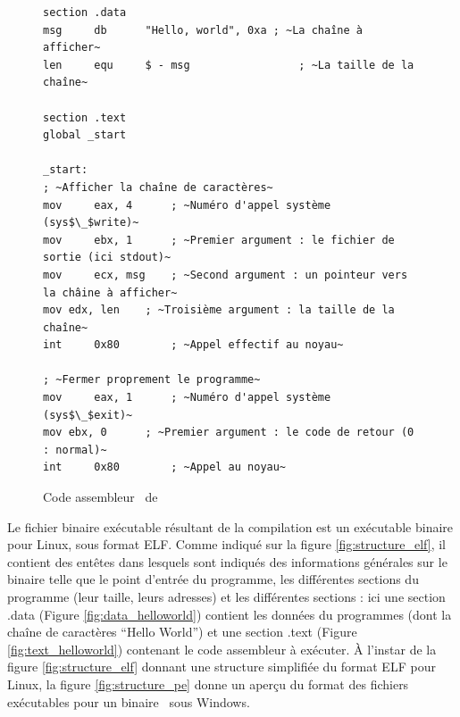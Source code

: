 \begin{figure}
\begin{lstlisting}[language={[x86masm]Assembler}, escapechar=~]
section .data
msg     db      "Hello, world", 0xa	; ~La chaîne à afficher~
len     equ     $ - msg                 ; ~La taille de la chaîne~

section .text
global _start

_start:
; ~Afficher la chaîne de caractères~
mov     eax, 4      ; ~Numéro d'appel système (sys$\_$write)~
mov     ebx, 1      ; ~Premier argument : le fichier de sortie (ici stdout)~
mov     ecx, msg    ; ~Second argument : un pointeur vers la châine à afficher~
mov	edx, len    ; ~Troisième argument : la taille de la chaîne~
int     0x80        ; ~Appel effectif au noyau~

; ~Fermer proprement le programme~
mov     eax, 1      ; ~Numéro d'appel système (sys$\_$exit)~
mov	ebx, 0	    ; ~Premier argument : le code de retour (0 : normal)~
int     0x80	    ; ~Appel au noyau~
\end{lstlisting}
\caption{Code assembleur \xq\ de \helloworld}
\label{fig:helloword_asm}
\end{figure}

Le fichier binaire exécutable résultant de la compilation est un exécutable binaire pour Linux, sous format ELF.
Comme indiqué sur la figure \ref{fig:structure_elf}, il contient des entêtes dans lesquels sont indiqués des informations générales sur le binaire telle que le point d'entrée du programme, les différentes sections du programme (leur taille, leurs adresses) et les différentes sections : ici une section .data (Figure \ref{fig:data_helloworld}) contient les données du programmes (dont la chaîne de caractères ``Hello World'') et une section .text (Figure \ref{fig:text_helloworld}) contenant le code assembleur à exécuter.
À l'instar de la figure \ref{fig:structure_elf} donnant une structure simplifiée du format ELF pour Linux, la figure \ref{fig:structure_pe} donne un aperçu du format des fichiers exécutables pour un binaire \xq\ sous Windows.

